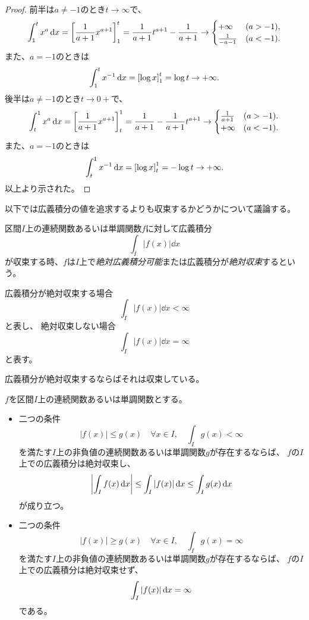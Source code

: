 \begin{proof}
前半は$a \ne -1$のとき$t \to \infty$で、
$$
\int_1^t x^a\dd{x} = \lreval*{\frac{1}{a+1}x^{a+1}}_1^t = \frac{1}{a+1}t^{a+1}-\frac{1}{a+1} \to
\begin{cases}
+\infty & (a > -1), \\
\frac{1}{-a-1} & (a < -1).
\end{cases}
$$
また、$a = -1$のときは
$$
\int_1^t x^{-1}\dd{x} = \lreval*{\log x}_1^t = \log t \to +\infty.
$$
後半は$a \ne -1$のとき$t \to 0+$で、
$$
\int_t^1 x^a\dd{x} = \lreval*{\frac{1}{a+1}x^{a+1}}_t^1 = \frac{1}{a+1}-\frac{1}{a+1}t^{a+1} \to
\begin{cases}
\frac{1}{a+1} & (a > -1). \\
+\infty & (a < -1).
\end{cases}
$$
また、$a = -1$のときは
$$
\int_t^1 x^{-1}\dd{x} = \lreval*{\log x}_t^1 = -\log t \to +\infty.
$$
以上より示された。
\end{proof}

以下では広義積分の値を追求するよりも収束するかどうかについて議論する。

\begin{definition}[広義積分の絶対収束]
区間$I$上の連続関数あるいは単調関数$f$に対して広義積分
$$
\int_I |f(x)|\dd{x}
$$
が収束する時、$f$は$I$上で\emph{絶対広義積分可能}または広義積分が\emph{絶対収束}するという。
\end{definition}

\begin{remark}
広義積分が絶対収束する場合
$$
\int_I |f(x)|\dd{x} < \infty
$$
と表し、
絶対収束しない場合
$$
\int_I |f(x)|\dd{x} = \infty
$$
と表す。
\end{remark}

\begin{remark}
広義積分が絶対収束するならばそれは収束している。
\end{remark}

\begin{proposition}[広義積分の比較判定法]
$f$を区間$I$上の連続関数あるいは単調関数とする。
\begin{itemize}
\item
二つの条件
$$
|f(x)| \le g(x) \quad \forall x \in I,
\quad \int_I g(x) < \infty
$$
を満たす$I$上の非負値の連続関数あるいは単調関数$g$が存在するならば、
$f$の$I$上での広義積分は絶対収束し、
$$
\abs{\int_I f(x)\dd{x}} \le \int_I \abs{f(x)}\dd{x} \le \int_I g(x)\dd{x}
$$
が成り立つ。
\item
二つの条件
$$
|f(x)| \ge g(x) \quad \forall x \in I,
\quad \int_I g(x) = \infty
$$
を満たす$I$上の非負値の連続関数あるいは単調関数$g$が存在するならば、
$f$の$I$上での広義積分は絶対収束せず、
$$
\int_I \abs{f(x)}\dd{x} = \infty
$$
である。
\end{itemize}
\end{proposition}

